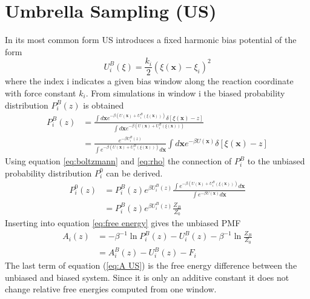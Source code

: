 \section{Umbrella Sampling (US)}
In its most common form US introduces a fixed harmonic bias potential of the form
\begin{equation}
  U_i^B(\xi) = \frac{k_i}{2}(\xi(\textbf{x})-\xi_i)^2 \label{eq:US bias}
\end{equation}
where the index i indicates a given bias window along the reaction coordinate with force constant $k_i$.\autocite{kastner2011umbrella} From simulations in window i the biased probability distribution $P_i^B(z)$ is obtained\autocite{kumar1992weighted}
\begin{equation}
\begin{split}
  P_i^B(z) &= \frac{\int d\textbf{x} e^{-\beta (U(\textbf{x})+U_i^B(\xi(\textbf{x})))}\delta[\xi(\textbf{x})-z]}
  {\int d\textbf{x} e^{-\beta (U(\textbf{x})+U_i^B(\xi(\textbf{x})))}} \\
             &= \frac{e^{-\beta U_i^B(z)}}{\int e^{-\beta (U(\textbf{x})+U_i^B(\xi(\textbf{x})))}d\textbf{x}} \int d\textbf{x} e^{-\beta U(\textbf{x})}\delta[\xi(\textbf{x})-z]
\end{split}
\end{equation}
Using equation \ref{eq:boltzmann} and \ref{eq:rho} the connection of $P_i^B$ to the unbiased probability distribution $P_i^0$ can be derived.
\begin{equation}
\begin{split}
  P_i^0(z) &= P_i^B(z)e^{\beta U_i^B(z)}\frac{\int e^{-\beta (U(\textbf{x})+U_i^B(\xi(\textbf{x})))}d\textbf{x}} {\int e^{-\beta U(\textbf{x})}d\textbf{x}} \\
  &= P_i^B(z)e^{\beta U_i^B(z)}\frac{Z_B}{Z_0}
\end{split}
\end{equation}
Inserting into equation \ref{eq:free energy} gives the unbiased PMF
\begin{equation}
  \begin{split}
  A_i(z) &= -\beta^{-1}\ln P_i^B(z) - U_i^B(z) - \beta^{-1}\ln\frac{Z_B}{Z_0} \\
           &= A_i^B(z) - U_i^B(z) - F_i \label{eq:A US}
  \end{split}
\end{equation}
The last term of equation (\ref{eq:A US}) is the free energy difference between the unbiased and biased system.
Since it is only an additive constant it does not change relative free energies computed from one window.\autocite{kumar1992weighted}
